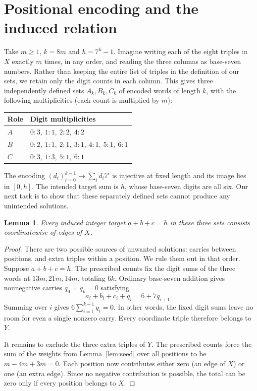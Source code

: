 \documentclass[11pt,a4paper]{article}
\newtheorem{lemma}{Lemma}
\begin{document}
\section{Positional encoding and the induced relation}
Take $m\ge1$, $k=8m$ and $h=7^k-1$. Imagine writing each of the eight triples in $X$ exactly $m$ times, in any order, and reading the three columns as base-seven numbers. Rather than keeping the entire list of triples in the definition of our sets, we retain only the digit counts in each column. This gives three independently defined sets $A_k,B_k,C_k$ of encoded words of length $k$, with the following multiplicities (each count is multiplied by $m$):
\begin{center}
\begin{tabular}{ll}
\toprule
Role & Digit multiplicities\\
\midrule
$A$ & $0:3,\ 1:1,\ 2:2,\ 4:2$\\
$B$ & $0:2,\ 1:1,\ 2:1,\ 3:1,\ 4:1,\ 5:1,\ 6:1$\\
$C$ & $0:3,\ 1:3,\ 5:1,\ 6:1$\\
\bottomrule
\end{tabular}
\end{center}
The encoding $(d_i)_{i=0}^{k-1}\mapsto\sum_i d_i7^i$ is injective at fixed length and its image lies in $[0,h]$. The intended target sum is $h$, whose base-seven digits are all six. Our next task is to show that these separately defined sets cannot produce any unintended solutions.
\begin{lemma}\label{lem:filter}
Every induced integer target $a+b+c=h$ in these three sets consists coordinatewise of edges of $X$.
\end{lemma}
\begin{proof}
There are two possible sources of unwanted solutions: carries between positions, and extra triples within a position. We rule them out in that order. Suppose $a+b+c=h$. The prescribed counts fix the digit sums of the three words at $13m,21m,14m$, totaling $6k$. Ordinary base-seven addition gives nonnegative carries $q_0=q_k=0$ satisfying
\[
a_i+b_i+c_i+q_i=6+7q_{i+1}.
\]
Summing over $i$ gives $6\sum_{i=1}^{k-1}q_i=0$. In other words, the fixed digit sums leave no room for even a single nonzero carry. Every coordinate triple therefore belongs to $Y$.

It remains to exclude the three extra triples of $Y$. The prescribed counts force the sum of the weights from Lemma~\ref{lem:seed} over all positions to be $m-4m+3m=0$. Each position now contributes either zero (an edge of $X$) or one (an extra edge). Since no negative contribution is possible, the total can be zero only if every position belongs to $X$.
\end{proof}
\end{document}

